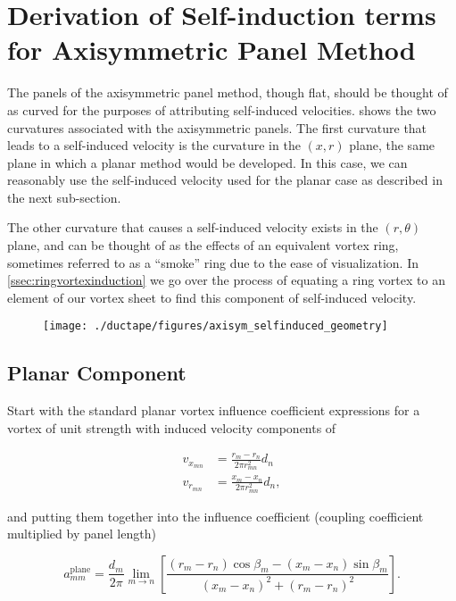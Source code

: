 \section{Derivation of Self-induction terms for Axisymmetric Panel Method}
\label{sec:axisym_selfinduction}

The panels of the axisymmetric panel method, though flat, should be thought of as curved for the purposes of attributing self-induced velocities.
 shows the two curvatures associated with the axisymmetric panels.
The first curvature that leads to a self-induced velocity is the curvature in the \((x,r)\) plane, the same plane in which a planar method would be developed.
In this case, we can reasonably use the self-induced velocity used for the planar case as described in the next sub-section.

The other curvature that causes a self-induced velocity exists in the \((r,\theta)\) plane, and can be thought of as the effects of an equivalent vortex ring, sometimes referred to as a ``smoke'' ring due to the ease of visualization.
In \cref{ssec:ringvortexinduction} we go over the process of equating a ring vortex to an element of our vortex sheet to find this component of self-induced velocity.

\begin{figure}[h!]
    \centering
    \texttt{[image: ./ductape/figures/axisym\_selfinduced\_geometry]}
    \caption{}
    \label{fig:axisym_selfinduced_geometry}
\end{figure}


\subsection{Planar Component}
\label{app:planarselfinducedvelocity}

Start with the standard planar vortex influence coefficient expressions for a vortex of unit strength with induced velocity components of

\begin{align}
    v_{x_{mn}} &= \frac{r_m - r_n}{2 \pi r^2_{mn}} d_n \\
    v_{r_{mn}} &= \frac{x_m - x_n}{2 \pi r^2_{mn}} d_n,
\end{align}

\noindent and putting them together into the influence coefficient (coupling coefficient multiplied by panel length)

\begin{equation}
    a^\text{plane}_{mm} = \frac{d_m}{2 \pi} \lim_{m\rightarrow n} \left[\frac{(r_m - r_n)\cos \beta_m  - (x_m - x_n)\sin \beta_m}{(x_m - x_n)^2+(r_m - r_n)^2}\right].
\end{equation}

